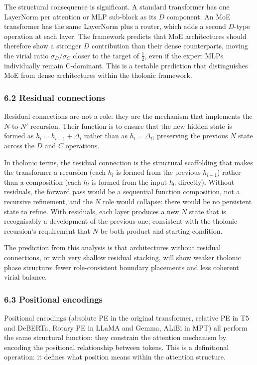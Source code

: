 \documentclass[
  11pt,
  letterpaper,
]{article}
\begin{document}
The structural consequence is significant. A standard transformer has
one LayerNorm per attention or MLP sub-block as its \(D\) component. An
MoE transformer has the same LayerNorm plus a router, which adds a
second \(D\)-type operation at each layer. The framework predicts that
MoE architectures should therefore show a stronger \(D\) contribution
than their dense counterparts, moving the virial ratio
\(\sigma_D / \sigma_C\) closer to the target of \(\frac{1}{2}\), even if
the expert MLPs individually remain C-dominant. This is a testable
prediction that distinguishes MoE from dense architectures within the
tholonic framework.

\subsubsection{6.2 Residual connections}\label{residual-connections}

Residual connections are not a role: they are the mechanism that
implements the \(N\)-to-\(N'\) recursion. Their function is to ensure
that the new hidden state is formed as \(h_l = h_{l-1} + \Delta_l\)
rather than as \(h_l = \Delta_l\), preserving the previous \(N\) state
across the \(D\) and \(C\) operations.

In tholonic terms, the residual connection is the structural scaffolding
that makes the transformer a recursion (each \(h_l\) is formed from the
previous \(h_{l-1}\)) rather than a composition (each \(h_l\) is formed
from the input \(h_0\) directly). Without residuals, the forward pass
would be a sequential function composition, not a recursive refinement,
and the \(N\) role would collapse: there would be no persistent state to
refine. With residuals, each layer produces a new \(N\) state that is
recognisably a development of the previous one, consistent with the
tholonic recursion's requirement that \(N\) be both product and starting
condition.

The prediction from this analysis is that architectures without residual
connections, or with very shallow residual stacking, will show weaker
tholonic phase structure: fewer role-consistent boundary placements and
less coherent virial balance.

\subsubsection{6.3 Positional encodings}\label{positional-encodings}

Positional encodings (absolute PE in the original transformer, relative
PE in T5 and DeBERTa, Rotary PE in LLaMA and Gemma, ALiBi in MPT) all
perform the same structural function: they constrain the attention
mechanism by encoding the positional relationship between tokens. This
is a definitional operation: it defines what position means within the
attention structure.
\end{document}
